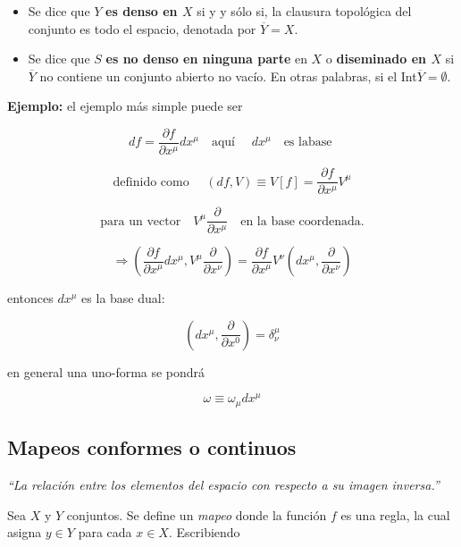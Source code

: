 \documentclass{report}
\begin{document}
\begin{itemize}
\item Se dice que $Y$ \textbf{es denso en $X$} si y y s\'olo si, la clausura topol\'ogica del conjunto es todo el espacio, denotada por $\overline{Y} = X$.\\

\item Se dice que $S$ \textbf{es no denso en ninguna parte} en $X$ o \textbf{diseminado en $X$}  si $\overline{Y}$ no contiene un conjunto abierto no vac\'io. En otras palabras, si el Int$\overline{Y} = \emptyset$.\\

\end{itemize}

\textbf{Ejemplo:} el ejemplo más simple puede ser

\[d f = \frac{\partial f}{\partial x ^{\mu }} dx^{\mu } \quad \text{aquí } \quad dx^{\mu } \quad \text{es labase }\]

\[\text{definido como } \quad (df, V ) \equiv V [f] = \frac{\partial f}{\partial x^{\mu}} V^{\mu} \]

\[\text{para un vector} \quad V^{\mu} \frac{\partial}{\partial x^{\mu}} \quad \text{en la base coordenada.}\]

\[\Rightarrow (\frac{\partial f }{\partial x^{\mu}} dx^{\mu} , V^{\mu } \frac{\partial }{\partial x^{\nu}}) = \frac{ \partial f }{\partial x^{\mu} } V^{\nu} (dx^{\mu} , \frac{\partial }{\partial x^{\nu}})\]

entonces $dx^{\mu}$ es la base dual:

\[(dx^{\mu} , \frac{\partial }{\partial x^0}) = \delta _{\nu} ^{\mu }\]

en general una uno-forma se pondrá

\begin{equation}
\omega \equiv \omega _{\mu} dx^{\mu}
\end{equation}




\subsection{Mapeos conformes o continuos}

\textit{``La relación entre los elementos del espacio con respecto a su imagen inversa.''}

Sea $X$ y $Y$ conjuntos. Se define un \textit{mapeo} donde la función $f$ es una regla, la cual asigna $y \in Y$ para cada $x \in X$. Escribiendo
\end{document}
